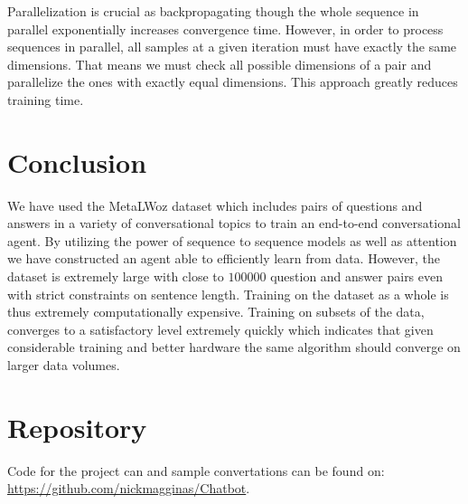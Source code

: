 \documentclass{article}
\begin{document}
\noindent
Parallelization is crucial as backpropagating though the whole sequence in parallel exponentially increases convergence time. However, in order to process sequences in parallel, all samples at a given iteration must have exactly the same dimensions. That means we must check all possible dimensions of a pair and parallelize the ones with exactly equal dimensions. This approach greatly reduces training time.


\section{Conclusion}
We have used the MetaLWoz dataset which includes pairs of questions and answers in a variety of conversational topics to train an end-to-end conversational agent. By utilizing the power of sequence to sequence models as well as attention we have constructed an agent able to efficiently learn from data. However, the dataset is extremely large with close to $100000$ question and answer pairs even with strict constraints on sentence length. Training on the dataset as a whole is thus extremely computationally expensive. Training on subsets of the data, converges to a satisfactory level extremely quickly which indicates that given considerable training and better hardware the same algorithm should converge on larger data volumes.

\section{Repository}
\label{Repos}
Code for the project can and sample convertations can be found on: \url{https://github.com/nickmagginas/Chatbot}. 

 

\end{document}
